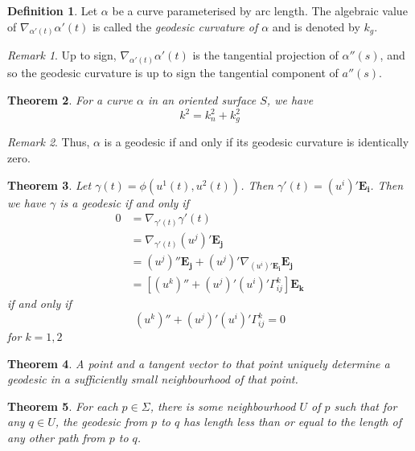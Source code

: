 \documentclass[10pt, oneside, reqno]{amsart}
\newcommand{\christ}[3]{\ensuremath{\Gamma^{#1}_{#2#3}}}
\theoremstyle{plain}%
\newtheorem{thm}{Theorem}[section]
\theoremstyle{definition}
\newtheorem{defn}[thm]{Definition}
\theoremstyle{remark}
\newtheorem*{rem}{Remark}
\begin{document}
\begin{defn}
        Let $\alpha$ be a curve parameterised by arc length.  The algebraic value of  $ \nabla_{\alpha'(t)} \alpha'(t)$ is called the \emph{geodesic curvature of $\alpha$} and is denoted by $k_g$.
\end{defn}

\begin{rem}
    Up to sign, $   \nabla_{\alpha'(t)} \alpha'(t)$ is the tangential projection of $\alpha''(s)$, and so the geodesic curvature is up to sign the tangential component of $a''(s)$.
\end{rem}

\begin{thm}
    For a curve $\alpha$ in an oriented surface $S$, we have \[
        k^2 = k_n^2 + k_g^2
    \]
\end{thm}

\begin{rem}
    Thus, $\alpha$ is a geodesic if and only if its geodesic curvature is identically zero.
\end{rem}

\begin{thm}
    Let $\gamma(t) = \phi(u^1(t), u^2(t))$.  Then $\gamma'(t) = (u^i)'\mathbf{E_i}$.  Then we have $\gamma$ is a geodesic if and only if 
    \begin{align*}
        0 &=    \nabla_{\gamma'(t)} \gamma'(t) \\
        &= \nabla_{\gamma'(t)} (u^j)' \mathbf{E_j} \\
        &= (u^j)'' \mathbf{E_j} + (u^j)' \nabla_{(u^i)' \mathbf{E_i}} \mathbf{E_j} \\
        &=  [(u^k)'' + (u^j)' (u^i)' \christ{k}{i}{j}] \mathbf{E_k}
    \end{align*}
    if and only if \[
        (u^k)'' + (u^j)' (u^i)' \christ{k}{i}{j} = 0
    \] for $k = 1,2$
\end{thm}

\begin{thm}
A point and a tangent vector to that point uniquely determine a geodesic in a sufficiently small neighbourhood of that point.
\end{thm}

\begin{thm}
    For each $p \in \Sigma$, there is some neighbourhood $U$ of $p$ such that for any $q \in U$, the geodesic from $p$ to $q$ has length less than or equal to the length of any other path from $p$ to $q$.
\end{thm}
\end{document}
